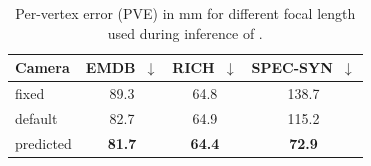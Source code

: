 \begin{table}
\centering
{\scriptsize
  \begin{tabular}{lccc}
    \toprule
     Camera & EMDB~\cite{emdb}$\downarrow$ & RICH~\cite{rich}$\downarrow$ & SPEC-SYN~\cite{spec}$\downarrow$ \\
    \midrule
    fixed   & 89.3 & 64.8 & 138.7 \\
    default  & 82.7& 64.9 & 115.2 \\
    predicted   & \textbf{81.7}& \textbf{64.4}& \textbf{72.9} \\
    \bottomrule
  \end{tabular}
  }
  \caption{Per-vertex error (PVE) in mm for different focal length used during inference of \hpsmodel.}
\label{abl}
\end{table}

